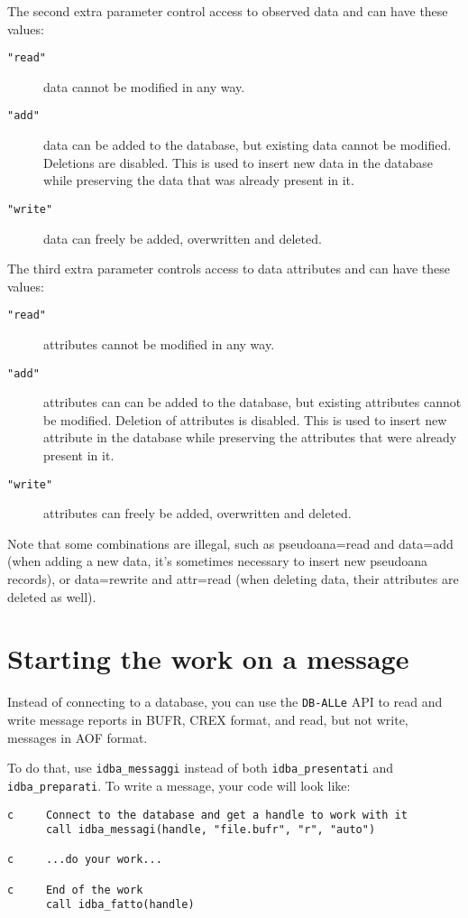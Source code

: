 \documentclass[final,12pt,a4paper,twoside]{book}
\newcommand{\dballe}{{\tt DB-ALLe}}
\begin{document}
The second extra parameter control access to observed data and can have
these values:

\begin{description}
\item[{\tt "read"}] data cannot be modified in any way.
\item[{\tt "add"}] data can be added to the database, but existing data cannot
		   be modified.  Deletions are disabled.  This is used to
		   insert new data in the database while preserving the data
		   that was already present in it.
\item[{\tt "write"}] data can freely be added, overwritten and deleted.
\end{description}

The third extra parameter controls access to data attributes and can have
these values:

\begin{description}
\item[{\tt "read"}] attributes cannot be modified in any way.
\item[{\tt "add"}] attributes can can be added to the database, but existing
		   attributes cannot be modified.  Deletion of attributes is
		   disabled.  This is used to insert new attribute in the
		   database while preserving the attributes that were already
		   present in it.
\item[{\tt "write"}] attributes can freely be added, overwritten and deleted.
\end{description}

Note that some combinations are illegal, such as pseudoana=read and data=add
(when adding a new data, it's sometimes necessary to insert new pseudoana
records), or data=rewrite and attr=read (when deleting data, their attributes
are deleted as well).

\section{Starting the work on a message}

Instead of connecting to a database, you can use the \dballe{} API to read and
write message reports in BUFR, CREX format, and read, but not write, messages
in AOF format.

To do that, use {\tt idba\_messaggi} instead of both {\tt idba\_presentati} and
{\tt idba\_preparati}.  To write a message, your code will look like:

\begin{verbatim}
c     Connect to the database and get a handle to work with it
      call idba_messagi(handle, "file.bufr", "r", "auto")

c     ...do your work...

c     End of the work
      call idba_fatto(handle)
\end{verbatim}
\end{document}
